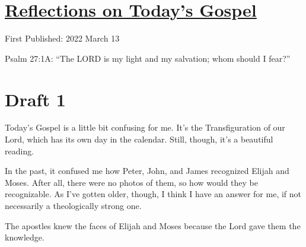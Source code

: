\documentclass[12pt]{article}[titlepage]
\newcommand{\say}[1]{``#1''}
\renewcommand{\,}{\textsuperscript{,}}
\begin{document}
\doublespacing
\section{\href{reflections-on-readings-1-lent-c-2022.html}{Reflections on Today's Gospel}}
First Published: 2022 March 13

Psalm 27:1A: \say{The LORD is my light and my salvation;
whom should I fear?}

\section{Draft 1}
Today's Gospel is a little bit confusing for me.
It's the Transfiguration of our Lord, which has its own day in the calendar.
Still, though, it's a beautiful reading.

In the past, it confused me how Peter, John, and James recognized Elijah and Moses.
After all, there were no photos of them, so how would they be recognizable.
As I've gotten older, though, I think I have an answer for me, if not necessarily a theologically strong one.

The apostles knew the faces of Elijah and Moses because the Lord gave them the knowledge.
\end{document}
